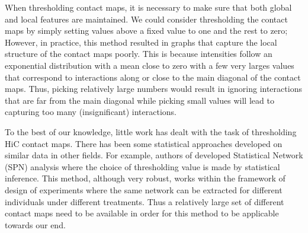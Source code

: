 \documentclass[a4,center,fleqn]{NAR}
\begin{document}
When thresholding contact maps, it is necessary to make sure
that both global and local features are maintained. We could consider 
thresholding the contact maps by simply setting values above a fixed value to
one and the rest to zero; However, in practice, this method resulted in graphs
that capture the local structure of the contact maps poorly. This is because
intensities follow an exponential distribution with a mean close to zero
with a few very larges values that correspond to interactions along 
or close to the main diagonal of the contact maps.
Thus, picking relatively large numbers would result in ignoring interactions
that are far from the main diagonal while picking small values will lead to
capturing too many (insignificant) interactions.

To the best of our knowledge, little work has dealt with the task of
thresholding HiC contact maps. There has been some statistical approaches
developed on similar data in other fields. 
For example, authors of \cite{ginestet2011statistical} developed 
Statistical Network (SPN) analysis
where the choice of thresholding value is made by statistical inference.
This method, although very robust, works within the framework of 
design of experiments where the same
network can be extracted for different 
individuals under different treatments. Thus a relatively large
set of different contact maps need to be available in order for
this method to be applicable towards our end.
\end{document}
